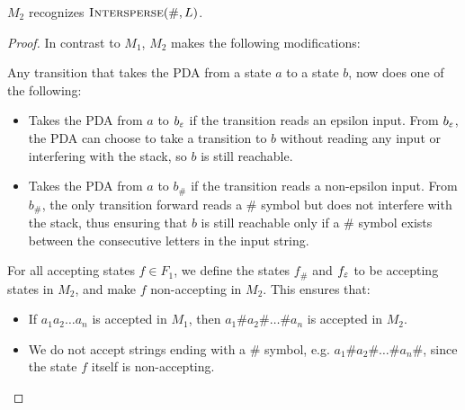 \begin{Answer}
  \newpage
  \begin{claim}
    $M_2$ recognizes $\textsc{Intersperse}(\#, L)$.

    \step
    \begin{proof}
      In contrast to $M_1$, $M_2$ makes the following modifications:
      \begin{enumroman}
        \item Any transition that takes the PDA from a state $a$ to a state $b$,
          now does one of the following:
          \begin{itemize}
            \item Takes the PDA from $a$ to $b_\varepsilon$ if the transition reads an epsilon input.
              From $b_\varepsilon$, the PDA can choose to take a transition to $b$
              without reading any input or interfering with the stack, so $b$ is still reachable.
            \item Takes the PDA from $a$ to $b_\#$ if the transition reads a non-epsilon input.
              From $b_\#$, the only transition forward reads a $\#$ symbol but does not interfere
              with the stack, thus ensuring that $b$ is still reachable only if a $\#$ symbol
              exists between the consecutive letters in the input string.
          \end{itemize}
        \item For all accepting states $f \in F_1$,
          we define the states $f_\#$ and $f_\varepsilon$ to be accepting states in $M_2$,
          and make $f$ non-accepting in $M_2$.
          This ensures that:
          \begin{itemize}
            \item If $a_1a_2 \ldots a_n$ is accepted in $M_1$, then $a_1 \# a_2 \# \ldots \# a_n$ is accepted in $M_2$.
            \item We do not accept strings ending with a $\#$ symbol, e.g. $a_1 \# a_2 \# \ldots \# a_n \#$, since
              the state $f$ itself is non-accepting.
          \end{itemize}
      \end{enumroman}
    \end{proof}
  \end{claim}
\end{Answer}
